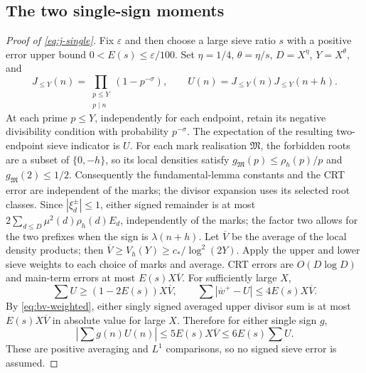 \documentclass[11pt]{article}
\theoremstyle{definition}
\theoremstyle{remark}
\numberwithin{equation}{section}
\begin{document}
\subsection{The two single-sign moments}
\begin{proof}[Proof of \eqref{eq:j-single}]
Fix $\varepsilon$ and then choose a large sieve ratio $s$ with a positive error upper bound
$0<E(s)\le\varepsilon/100$. Set $\eta=1/4$, $\theta=\eta/s$, $D=X^\eta$, $Y=X^\theta$, and
\begin{equation}\label{eq:a-truncated}
 J_{\le Y}(n)=\prod_{\substack{p\le Y\\p\mid n}}(1-p^{-\sigma}),\qquad
 U(n)=J_{\le Y}(n)J_{\le Y}(n+h).
\end{equation}
At each prime $p\le Y$, independently for each endpoint, retain its negative divisibility condition
with probability $p^{-\sigma}$. The expectation of the resulting two-endpoint sieve indicator is $U$.
For each mark realisation $\mathfrak M$, the forbidden roots are a subset of $\{0,-h\}$, so its local
densities satisfy $g_{\mathfrak M}(p)\le\rho_h(p)/p$ and $g_{\mathfrak M}(2)\le1/2$.
Consequently the fundamental-lemma constants and the CRT error are independent of the marks;
the divisor expansion uses its selected root classes. Since $|\xi_d^\pm|\le1$, either signed remainder
is at most $2\sum_{d\le D}\mu^2(d)\rho_h(d)E_d$, independently of the marks; the factor two allows
for the two prefixes when the sign is $\lambda(n+h)$. Let $\overline V$ be the
average of the local density products; then $\overline V\ge V_h(Y)\ge c_*/\log^2(2Y)$.
Apply the upper and lower sieve weights to each choice of marks and average. CRT errors are
$O(D\log D)$ and main-term errors at most $E(s)X\overline V$. For sufficiently large $X$,
\begin{equation}\label{eq:a-truncated-mass}
 \sum U\ge(1-2E(s))X\overline V,
 \qquad\sum|\overline w^+-U|\le4E(s)X\overline V.
\end{equation}
By \eqref{eq:bv-weighted}, either singly signed averaged upper divisor sum is at most
$E(s)X\overline V$ in absolute value for large $X$. Therefore for either single sign $g$,
\begin{equation}\label{eq:a-truncated-sign}
 \left|\sum g(n)U(n)\right|\le5E(s)X\overline V\le6E(s)\sum U.
\end{equation}
These are positive averaging and $L^1$ comparisons, so no signed sieve error is assumed.


\end{proof}
\end{document}
